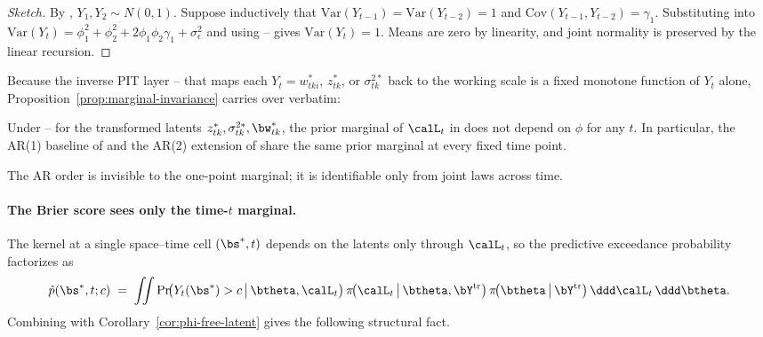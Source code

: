 \begin{proof}[Sketch]
By , $Y_1, Y_2 \sim N(0,1)$.  Suppose inductively that $\mathrm{Var}(Y_{t-1}) = \mathrm{Var}(Y_{t-2}) = 1$ and $\mathrm{Cov}(Y_{t-1}, Y_{t-2}) = \gamma_1$.  Substituting  into $\mathrm{Var}(Y_t) = \phi_1^2 + \phi_2^2 + 2\phi_1\phi_2\gamma_1 + \sigma_\epsilon^2$ and using -- gives $\mathrm{Var}(Y_t) = 1$.  Means are zero by linearity, and joint normality is preserved by the linear recursion.
\end{proof}

Because the inverse PIT layer -- that maps each $Y_t = w^*_{tki}$, $z^*_{tk}$, or $\sigma^{2*}_{tk}$ back to the working scale is a fixed monotone function of $Y_t$ alone, Proposition~\ref{prop:marginal-invariance} carries over verbatim:

\begin{corollary}\label{cor:phi-free-latent}
Under -- for the transformed latents $z^*_{tk}, \sigma^{2*}_{tk}, \bw^*_{tk}$, the prior marginal of $\calL_t$ in  does not depend on $\phi$ for any $t$.  In particular, the AR(1) baseline of \textcite{morris_space-time_2017} and the AR(2) extension of  share the same prior marginal at every fixed time point.
\end{corollary}

The AR order is invisible to the one-point marginal; it is identifiable only from joint laws across time.

\paragraph{The Brier score sees only the time-$t$ marginal.}

The kernel  at a single space--time cell $(\bs^*, t)$ depends on the latents only through $\calL_t$, so the predictive exceedance probability factorizes as
\begin{align}
  \hat p(\bs^*, t; c)
   \;=\; \iint \mathrm{Pr}\!\big(Y_t(\bs^*) > c \,\big|\, \btheta, \calL_t\big)\,
            \pi\!\big(\calL_t \,\big|\, \btheta, \bY^{\mathrm{tr}}\big)\,
            \pi\!\big(\btheta \,\big|\, \bY^{\mathrm{tr}}\big)\,
            \ddd\calL_t \, \ddd\btheta.
   \label{eq:predictive-disc}
\end{align}
Combining  with Corollary~\ref{cor:phi-free-latent} gives the following structural fact.

